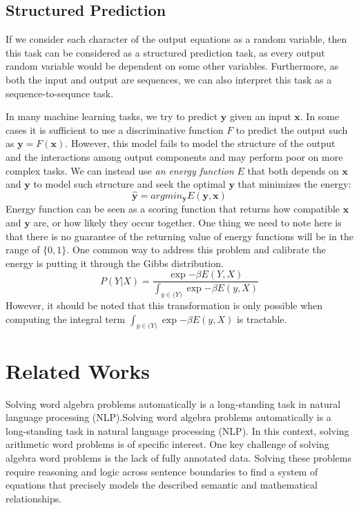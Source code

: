 \documentclass[11pt,letterpaper]{article}
\begin{document}
\subsection{Structured Prediction}
If we consider each character of the output equations as a random variable, then this task can be considered as a structured prediction task, as every output random variable would be dependent on some other variables. Furthermore, as both the input and output are sequences, we can also interpret this task as a sequence-to-sequnce task.

In many machine learning tasks, we try to predict $\textbf{y}$ given an input $\textbf{x}$. In some cases it is sufficient to use a discriminative function $F$ to predict the output such as $\textbf{y} = F( \textbf{x} )$. However, this model fails to model the structure of the output and the interactions among output components and may perform poor on more complex tasks. We can instead use \textit{an energy function} $E$ that both depends on $\textbf{x}$ and $\textbf{y}$ to model such structure and seek the optimal $\textbf{y}$ that minimizes the energy:
\begin{equation}
\hat{\mathbf{y}} = argmin_{\mathbf{y}} E( \mathbf{y}, \mathbf{x} )%
\label{ebm0}
\end{equation}
Energy function can be seen as a scoring function that returns how compatible $\mathbf{x}$ and $\mathbf{y}$ are, or how likely they occur together.
One thing we need to note here is that there is no guarantee of the returning value of energy functions will be in the range of $\{ 0, 1\}$. One common way to address this problem and calibrate the energy is putting it through the Gibbs distribution.
\begin{equation}
P(Y|X) = \frac{ \exp{- \beta E(Y, X)} }{\int_{y \in \mathcal(Y)} \exp{- \beta E(y, X)}  }
\label{ebm1}
\end{equation}
However, it should be noted that this transformation is only possible when computing the integral term $\int_{y \in \mathcal(Y)} \exp{- \beta E(y, X)}$ is tractable.
\section{Related Works}
Solving word algebra problems automatically is a long-standing task in natural language processing (NLP).Solving word algebra problems automatically is a long-standing task in natural language processing (NLP). In this context, solving arithmetic word problems is of specific interest. One key challenge of solving algebra word problems is the lack of fully annotated data. Solving these problems require reasoning and logic across sentence boundaries to find a system of equations that precisely models the described semantic and mathematical relationships.
\end{document}

